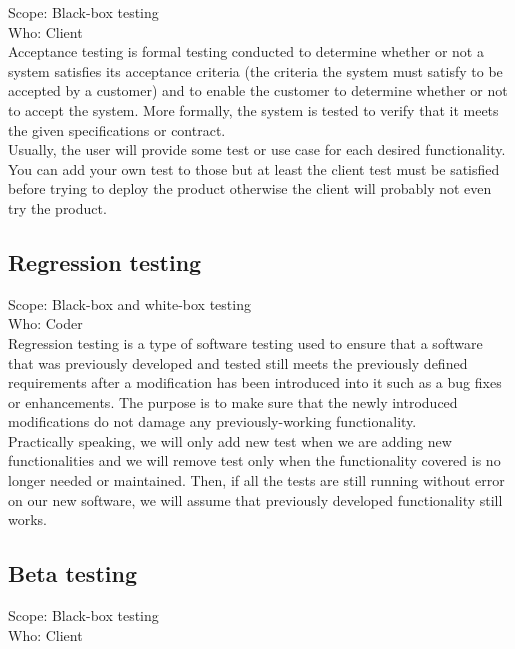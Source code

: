 \documentclass[12pt]{article}
\theoremstyle{definition}
\theoremstyle{definition}
\theoremstyle{remark}
\begin{document}
Scope: Black-box testing\\
Who: Client\\

Acceptance testing is formal testing conducted to determine whether or not a system satisfies its acceptance criteria (the criteria the system must satisfy to be accepted by a customer) and to enable the customer to determine whether or not to accept the system. More formally, the system is tested to verify that it meets the given specifications or contract.\\

Usually, the user will provide some test or use case for each desired functionality. You can add your own test to those but at least the client test must be satisfied before trying to deploy the product otherwise the client will probably not even try the product.


\subsection{Regression testing}

Scope: Black-box and white-box testing\\
Who: Coder\\

Regression testing is a type of software testing used to ensure that a software that was previously developed and tested still meets the previously defined requirements after a modification has been introduced into it such as a bug fixes or enhancements. The purpose is to make sure that the newly introduced modifications do not damage any previously-working functionality.\\

Practically speaking, we will only add new test when we are adding new functionalities and we will remove test only when the functionality covered is no longer needed or maintained. Then, if all the tests are still running without error on our new software, we will assume that previously developed functionality still works.


\subsection{Beta testing}

Scope: Black-box testing\\
Who: Client\\
\end{document}
